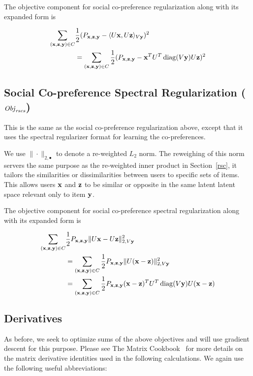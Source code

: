 The objective component for 
social co-preference regularization along with its expanded form is

\begin{align}
\sum_{(\mathbf{x},\mathbf{z},\mathbf{y}) \in C} & \frac{1}{2} (P_{\mathbf{x},\mathbf{z},\mathbf{y}} - \langle U\mathbf{x}, U\mathbf{z} \rangle_{V\mathbf{y}})^2 \nonumber \\
& = \sum_{(\mathbf{x},\mathbf{z},\mathbf{y}) \in C} \frac{1}{2} (P_{\mathbf{x},\mathbf{z},\mathbf{y}} - \mathbf{x}^T U^T \operatorname{diag}(V\mathbf{y}) U \mathbf{z})^2
\end{align}


\subsection{Social Co-preference Spectral Regularization ($\mathit{Obj}_{\mathit{rscs}}$)}
This is the same as the social co-preference regularization above, except that it uses the spectral regularizer format for 
learning the co-preferences.

 We use $\| \cdot \|_{2,\bullet}$ to denote a re-weighted $L_2$ norm. The reweighing of this norm servers the same purpose as the re-weighted inner product in Section~\ref{rsc}, it tailors the similarities or dissimilarities between users to specific sets of items. This allows users $\mathbf{x}$
and $\mathbf{z}$ to be similar or opposite in the same latent latent space
relevant only to item $\mathbf{y}$.  
 
 The objective component for
 social co-preference spectral regularization along with its expanded form is
 
\begin{align}
\sum_{(\mathbf{x},\mathbf{z},\mathbf{y}) \in C} & \frac{1}{2} P_{\mathbf{x},\mathbf{z},\mathbf{y}} \| U\mathbf{x} - U\mathbf{z} \|_{2,V\mathbf{y}}^2 \nonumber \\
& = \sum_{(\mathbf{x},\mathbf{z},\mathbf{y}) \in C} \frac{1}{2} P_{\mathbf{x},\mathbf{z},\mathbf{y}} \| U (\mathbf{x} - \mathbf{z}) \|_{2,V\mathbf{y}}^2 \nonumber \\
& = \sum_{(\mathbf{x},\mathbf{z},\mathbf{y}) \in C} \frac{1}{2} P_{\mathbf{x},\mathbf{z},\mathbf{y}} (\mathbf{x} - \mathbf{z})^T U^T \operatorname{diag}(V\mathbf{y}) U (\mathbf{x} - \mathbf{z})
\end{align}

\subsection{Derivatives}
As before, we seek to optimize sums of the above objectives and will use
gradient descent for this purpose. Please see The Matrix Cookbook~\cite{matrix} for more details on the matrix derivative identities used in the following calculations.
We again use the following useful abbreviations:

